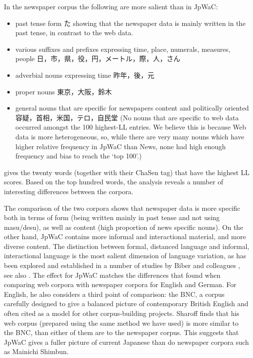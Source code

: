 \documentclass[english]{jnlp_1.4}
\newcommand{\reftab}[1]{}
\begin{document}
In the newspaper corpus the following are more salient than in JpWaC:
\begin{itemize}
\item past tense form た showing that the newspaper data is mainly written in the past tense, in contrast to the web data.
\item various suffixes and prefixes expressing time, place, numerals, measures, people 日，市，県，役，円，メートル，際，人，さん
\item adverbial nouns expressing time 昨年，後，元
\item proper nouns 東京，大阪，鈴木
\item general nouns that are specific for newspapers content and politically oriented 容疑，首相，米国，テロ，自民堂 (No nouns that are specific to web data occurred amongst the 100 highest-LL entries. We believe this is because Web data is more heterogeneous, so, while there are very many nouns which have higher relative frequency in JpWaC than News, none had high enough frequency and bias to reach the `top 100'.)
\end{itemize}

\reftab{tab3} gives the twenty words (together with their ChaSen tag)
that have the highest LL scores. Based on the top hundred words, the
analysis reveals a number of interesting differences between the
corpora.

The comparison of the two corpora shows that newspaper data is more
specific both in terms of form (being written mainly in past tense and
not using masu/desu), as well as content (high proportion of news
specific nouns). On the other hand, JpWaC contains more informal and
interactional material, and more diverse content. The distinction
between formal, distanced language and informal, interactional
language is the most salient dimension of language variation, as has
been explored and established in a number of studies by Biber and
colleagues , see also .
The effect for JpWaC matches the differences that  
found when comparing web corpora with
newspaper corpora for English and German. For English, he also
considers a third point of comparison: the BNC, a corpus carefully
designed to give a balanced picture of contemporary British English
and often cited as a model for other corpus-building projects. Sharoff
finds that his web corpus (prepared using the same method we have
used) is more similar to the BNC, than either of them are to the
newspaper corpus. This suggests that JpWaC gives a fuller picture of
current Japanese than do newspaper corpora such as Mainichi Shimbun.
\end{document}
